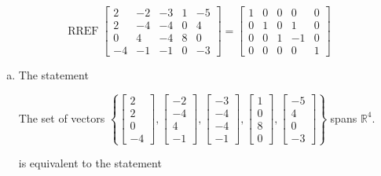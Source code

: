 \begin{exerciseAnswer} 


\[\operatorname{RREF} \left[\begin{array}{ccccc}
2 & -2 & -3 & 1 & -5 \\
2 & -4 & -4 & 0 & 4 \\
0 & 4 & -4 & 8 & 0 \\
-4 & -1 & -1 & 0 & -3
\end{array}\right] = \left[\begin{array}{ccccc}
1 & 0 & 0 & 0 & 0 \\
0 & 1 & 0 & 1 & 0 \\
0 & 0 & 1 & -1 & 0 \\
0 & 0 & 0 & 0 & 1
\end{array}\right] \]


\begin{enumerate}[(a)]
\item The statement 
\begin{center}\begin{minipage}{0.8\textwidth}
 The set of vectors \( \left\{ \left[\begin{array}{c}
2 \\
2 \\
0 \\
-4
\end{array}\right] , \left[\begin{array}{c}
-2 \\
-4 \\
4 \\
-1
\end{array}\right] , \left[\begin{array}{c}
-3 \\
-4 \\
-4 \\
-1
\end{array}\right] , \left[\begin{array}{c}
1 \\
0 \\
8 \\
0
\end{array}\right] , \left[\begin{array}{c}
-5 \\
4 \\
0 \\
-3
\end{array}\right] \right\} \) spans \(\mathbb{R}^4\). 
\end{minipage}\end{center}
     is equivalent to the statement 

\end{enumerate}
\end{exerciseAnswer}
